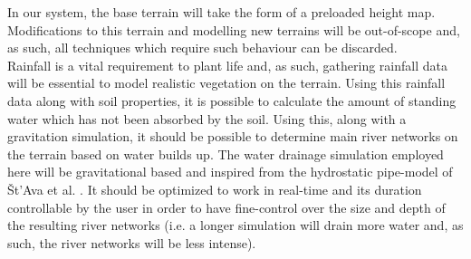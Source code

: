 In our system, the base terrain will take the form of a preloaded height map. Modifications to this terrain and modelling new terrains will be out-of-scope and, as such, all techniques which require such behaviour can be discarded.\\
Rainfall is a vital requirement to plant life and, as such, gathering rainfall data will be essential to model realistic vegetation on the terrain. Using this rainfall data along with soil properties, it is possible to calculate the amount of standing water which has not been absorbed by the soil. Using this, along with a gravitation simulation, it should be possible to determine main river networks on the terrain based on water builds up. The water drainage simulation employed here will be gravitational based and inspired from the hydrostatic pipe-model of Št'Ava et al. \cite{StAva2008}. It should be optimized to work in real-time and its duration controllable by the user in order to have fine-control over the size and depth of the resulting river networks (i.e. a longer simulation will drain more water and, as such, the river networks will be less intense).
